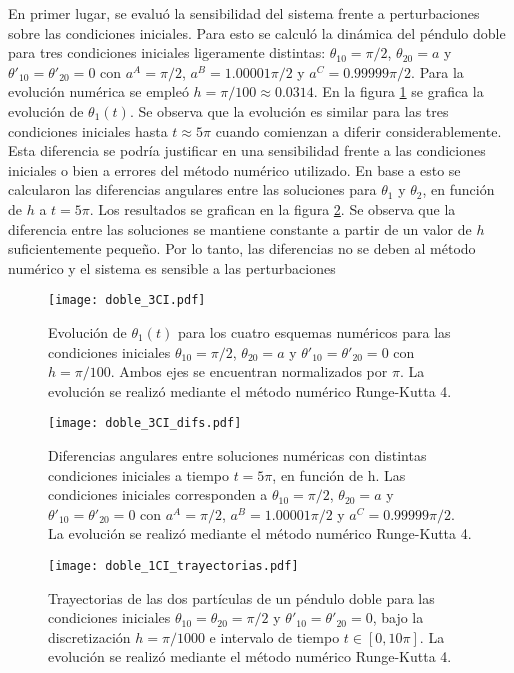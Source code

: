 \documentclass[aps,prb,twocolumn,superscriptaddress,floatfix,longbibliography,10pt]{revtex4-2}
\newcounter{para}
\begin{document}
En primer lugar, se evaluó la sensibilidad del sistema frente a perturbaciones sobre las condiciones iniciales. Para esto se calculó la dinámica del péndulo doble para tres condiciones iniciales ligeramente distintas: $\theta_{1 0} = \pi/2$, $\theta_{2 0} = a$ y $\theta'_{1 0} = \theta'_{2 0} = 0$ con $a^A = \pi/2$, $a^B = 1.00001 \pi/2$ y $a^C = 0.99999 \pi/2$. Para la evolución numérica se empleó $h = \pi/100 \approx 0.0314$. En la figura \ref{fig:doble_3CI} se grafica la evolución de $\theta_1(t)$. Se observa que la evolución es similar para las tres condiciones iniciales hasta $t \approx 5 \pi$ cuando comienzan a diferir considerablemente. Esta diferencia se podría justificar en una sensibilidad frente a las condiciones iniciales o bien a errores del método numérico utilizado. En base a esto se calcularon las diferencias angulares entre las soluciones para $\theta_1$ y $\theta_2$, en función de $h$ a $t = 5 \pi$. Los resultados se grafican en la figura \ref{fig:doble_3CI_difs}. Se observa que la diferencia entre las soluciones se mantiene constante a partir de un valor de $h$ suficientemente pequeño. Por lo tanto, las diferencias no se deben al método numérico y el sistema es sensible a las perturbaciones

\begin{figure}[h]
  \texttt{[image: doble\_3CI.pdf]}
  \caption{Evolución de $\theta_1(t)$ para los cuatro esquemas numéricos para las condiciones iniciales $\theta_{1 0} = \pi/2$, $\theta_{2 0} = a$ y $\theta'_{1 0} = \theta'_{2 0} = 0$ con $h = \pi/100$. Ambos ejes se encuentran normalizados por $\pi$. La evolución se realizó mediante el método numérico Runge-Kutta 4.}
   \label{fig:doble_3CI}
\end{figure}


\begin{figure}[h]
  \texttt{[image: doble\_3CI\_difs.pdf]}
  \caption{Diferencias angulares entre soluciones numéricas con distintas condiciones iniciales a tiempo $t = 5 \pi$, en función de h. Las condiciones iniciales corresponden a $\theta_{1 0} = \pi/2$, $\theta_{2 0} = a$ y $\theta'_{1 0} = \theta'_{2 0} = 0$ con $a^A = \pi/2$, $a^B = 1.00001 \pi/2$ y $a^C = 0.99999 \pi/2$. La evolución se realizó mediante el método numérico Runge-Kutta 4.}
   \label{fig:doble_3CI_difs}
\end{figure}

\begin{figure}[h]
  \texttt{[image: doble\_1CI\_trayectorias.pdf]}
  \caption{Trayectorias de las dos partículas de un péndulo doble para las condiciones iniciales  $\theta_{1 0} = \theta_{2 0} = \pi/2$ y $\theta'_{1 0} = \theta'_{2 0} = 0$, bajo la discretización $h = \pi/1000$ e intervalo de tiempo $t \in [0, 10 \pi]$. La evolución se realizó mediante el método numérico Runge-Kutta 4.}
   \label{fig:doble_1CI_trayectorias}
\end{figure}
\end{document}
